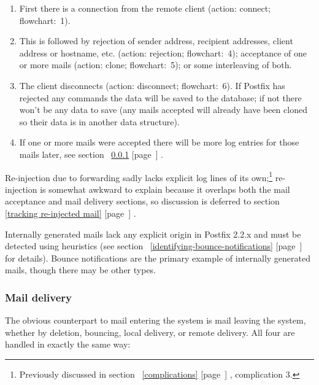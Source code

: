 \documentclass[a4paper,12pt,draft]{article}
\newcommand{\refwithpage}[1]{%
    \empty{}\ref{#1} [page~\pageref{#1}]%
}
\begin{document}
\begin{enumerate}

    \item First there is a connection from the remote client
        (action: connect; flowchart:~1).

    \item This is followed by rejection of sender address, recipient
        addresses, client \IP{} address or hostname, etc. (action:
        rejection; flowchart:~4); acceptance of one or more mails (action:
        clone; flowchart:~5); or some interleaving of both.

    \item The client disconnects (action: disconnect; flowchart:~6).  If
        Postfix has rejected any \SMTP{} commands the data will be saved to
        the database; if not there won't be any data to save (any mails
        accepted will already have been cloned so their data is in another
        data structure).

    \item If one or more mails were accepted there will be more log entries
        for those mails later, see section~\refwithpage{mail-delivery}.

\end{enumerate}

Re-injection due to forwarding sadly lacks explicit log lines of its
own;\footnote{Previously discussed in section~\refwithpage{complications},
complication 3.} re-injection is somewhat awkward to explain because it
overlaps both the mail acceptance and mail delivery sections, so discussion
is deferred to section~\refwithpage{tracking re-injected mail}.

Internally generated mails lack any explicit origin in Postfix 2.2.x and
must be detected using heuristics (see
section~\refwithpage{identifying-bounce-notifications} for details).
Bounce notifications are the primary example of internally generated mails,
though there may be other types.

\subsubsection{Mail delivery}

\label{mail-delivery}

The obvious counterpart to mail entering the system is mail leaving the
system, whether by deletion, bouncing, local delivery, or remote delivery.
All four are handled in exactly the same way:
\end{document}

